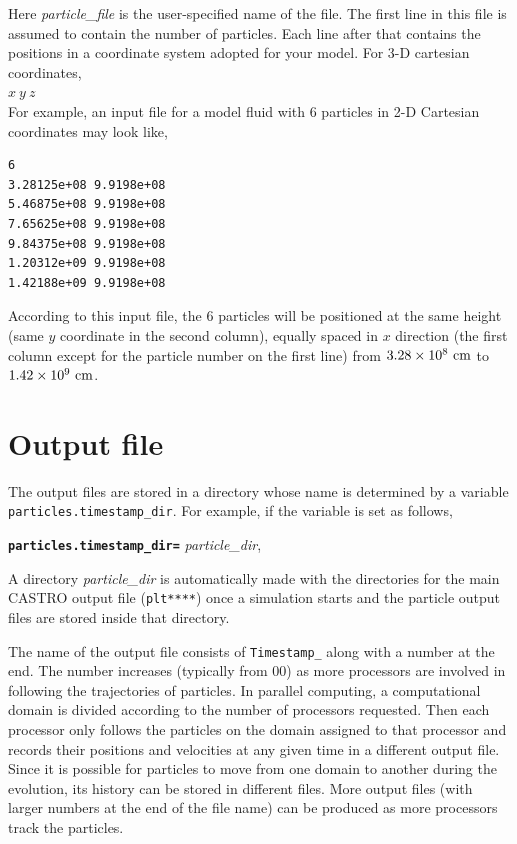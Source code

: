 \vspace{0.1in}
\vspace{0.1in}

\noindent Here {\em particle\_file} is the user-specified name of the file. The first line in this file is
assumed to contain the number of particles.  Each line after that contains the positions in a coordinate system adopted for your model. For 3-D cartesian coordinates, \\

$x ~y ~z$ \\

For example, an input file for a model fluid with 6 particles in 2-D Cartesian coordinates may look like,\\

\begin{lstlisting}
6
3.28125e+08 9.9198e+08 
5.46875e+08 9.9198e+08 
7.65625e+08 9.9198e+08 
9.84375e+08 9.9198e+08 
1.20312e+09 9.9198e+08 
1.42188e+09 9.9198e+08 
\end{lstlisting}

According to this input file, the 6 particles will be positioned at the same height (same $y$ coordinate in the second column), equally spaced in $x$ direction (the first column except for the particle number on the first line) from $3.28\times10^{8} {\rm ~cm}$ to $1.42\times 10^{9} {\rm ~cm}$.





\section{Output file}
\label{particles:output_file}
\noindent The output files are stored in a directory whose name is determined by a variable {\tt particles.timestamp\_dir}. For example, if the variable is set as follows,

\vspace{0.1in}
{\tt  {\bf particles.timestamp\_dir=}} {\em particle\_dir},
\vspace{0.1in}

\noindent A directory {\em particle\_dir} is automatically made with the directories for the main CASTRO output file ({\tt plt****}) once a simulation starts and the particle output files are stored inside that directory.

\vspace{0.05in}
\noindent The name of the output file consists of {\tt Timestamp\_} along with a number at the end. The number increases (typically from 00) as more processors are involved in following the trajectories of particles. In parallel computing, a computational domain is divided according to the number of processors requested. Then each processor only follows the particles on the domain assigned to that processor and records their positions and velocities at any given time in a different output file. Since it is possible for particles to move from one domain to another during the evolution, its history can be stored in different files. More output files (with larger numbers at the end of the file name) can be produced as more processors track the particles.  

